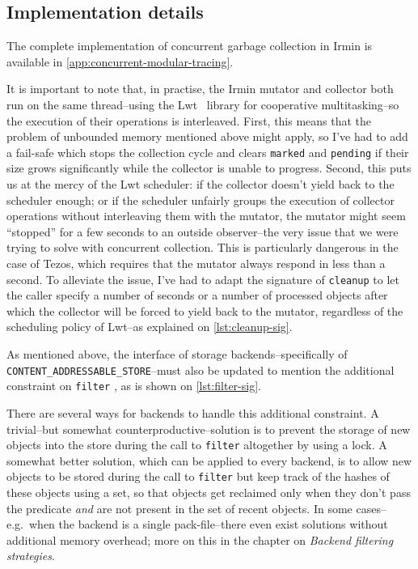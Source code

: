 \subsection{Implementation details}

The complete implementation of concurrent garbage collection in Irmin is available in \cref{app:concurrent-modular-tracing}.

It is important to note that, in practise, the Irmin mutator and collector both run on the same thread--using the Lwt~\cite{lwt-manual} library for cooperative multitasking--so the execution of their operations is interleaved. First, this means that the problem of unbounded memory mentioned above might apply, so I've had to add a fail-safe which stops the collection cycle and clears \texttt{marked} and \texttt{pending} if their size grows significantly while the collector is unable to progress. Second, this puts us at the mercy of the Lwt scheduler: if the collector doesn't yield back to the scheduler enough; or if the scheduler unfairly groups the execution of collector operations without interleaving them with the mutator, the mutator might seem ``stopped'' for a few seconds to an outside observer--the very issue that we were trying to solve with concurrent collection. This is particularly dangerous in the case of Tezos, which requires that the mutator always respond in less than a second. To alleviate the issue, I've had to adapt the signature of \texttt{cleanup} to let the caller specify a number of seconds or a number of processed objects after which the collector will be forced to yield back to the mutator, regardless of the scheduling policy of Lwt--as explained on \cref{lst:cleanup-sig}.



\vspace{-1em}
As mentioned above, the interface of storage backends--specifically of \texttt{CONTENT\_ADDRESSABLE\_STORE}--must also be updated to mention the additional constraint on \texttt{filter} , as is shown on \cref{lst:filter-sig}.



\vspace{-1em}
There are several ways for backends to handle this additional constraint. A trivial--but somewhat counterproductive--solution is to prevent the storage of new objects into the store during the call to \texttt{filter} altogether by using a lock. A somewhat better solution, which can be applied to every backend, is to allow new objects to be stored during the call to \texttt{filter} but keep track of the hashes of these objects using a set, so that objects get reclaimed only when they don't pass the predicate \emph{and} are not present in the set of recent objects. In some cases--e.g.~when the backend is a single pack-file--there even exist solutions without additional memory overhead; more on this in the chapter on \emph{Backend filtering strategies}.